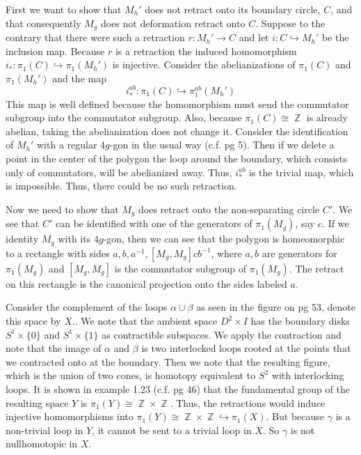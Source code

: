 \documentclass{article}
\DeclareMathOperator{\Z}{\mathbb{Z}}
\DeclareMathOperator{\into}{\hookrightarrow}
\newcommand{\exercise}[1]{\noindent{\textbf{Exercise #1:}}}
\begin{document}
\exercise{1.2.9}

First we want to show that $M_h'$ does not retract onto its boundary
circle, $C$, and that consequently $M_g$ does not deformation retract
onto $C$. Suppose to the contrary that there were such a retraction
$r: M_h' \to C$ and let $i: C \into M_h'$ be the inclusion
map. Because $r$ is a retraction the induced homomorphism $i_*:
\pi_1(C) \into \pi_1(M_h')$ is injective. Consider the abelianizations
of $\pi_1(C)$ and $\pi_1(M_h')$ and the map
\[
i_*^{ab}: \pi_1(C) \into \pi_1^{ab}(M_h')
\]
This map is well defined because the homomorphism must send the
commutator subgroup into the commutator subgroup. Also, because
$\pi_1(C) \cong \Z$ is already abelian, taking the abelianization does
not change it. Consider the identification of $M_h'$ with a regular
$4g$-gon in the usual way (c.f. pg 5). Then if we delete a point in
the center of the polygon the loop around the boundary, which consists
only of commutators, will be abelianized away. Thus, $i_*^{ab}$ is the
trivial map, which is impossible. Thus, there could be no such
retraction.

Now we need to show that $M_g$ does retract onto the non-separating
circle $C'$. We see that $C'$ can be identified with one of the
generators of $\pi_1(M_g)$, say $c$. If we identity $M_g$ with its
$4g$-gon, then we can see that the polygon is homeomorphic to a
rectangle with sides $a,b,a^{-1},[M_g,M_g]cb^{-1}$, where $a,b$ are
generators for $\pi_1(M_g)$ and $[M_g,M_g]$ is the commutator subgroup
of $\pi_1(M_g)$. The retract on this rectangle is the canonical
projection onto the sides labeled $a$.

\exercise{1.2.10}

Consider the complement of the loops $\alpha \cup \beta$ as seen in
the figure on pg 53, denote this space by $X$.. We note that the
ambient space $D^2 \times I$ has the boundary disks $S^1 \times \{0\}$
and $S^1\times\{1\}$ as contractible subspaces. We apply the
contraction and note that the image of $\alpha$ and $\beta$ is two
interlocked loops rooted at the points that we contracted onto at the
boundary. Then we note that the resulting figure, which is the union
of two cones, is homotopy equivalent to $S^2$ with interlocking
loops. It is shown in example 1.23 (c.f. pg 46) that the fundamental
group of the resulting space $Y$ is $\pi_1(Y) \cong \Z \times
\Z$. Thus, the retractions would induce injective homomorphisms into
$\pi_1(Y) \cong \Z \times \Z \into \pi_1(X)$. But because $\gamma$ is
a non-trivial loop in $Y$, it cannot be sent to a trivial loop in
$X$. So $\gamma$ is not nullhomotopic in $X$.
\end{document}
